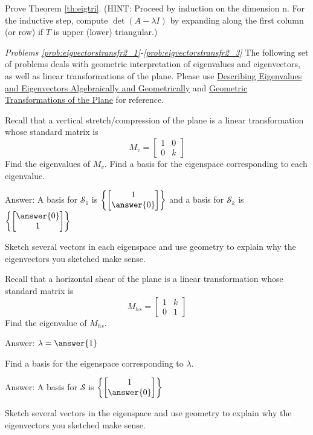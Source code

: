 \documentclass{ximera}
\begin{document}
\begin{problem}\label{prob:eigtri}
Prove Theorem \ref{th:eigtri}.  (HINT:  Proceed by induction on the dimension n.  For the inductive step, compute $\det(A-\lambda I)$ by expanding along the first column (or row) if $T$ is upper (lower) triangular.)
\end{problem}

\emph{Problems \ref{prob:eigvectorstransfr2_1}-\ref{prob:eigvectorstransfr2_3}}
The following set of problems deals with geometric interpretation of eigenvalues and eigenvectors, as well as linear transformations of the plane.  Please use \href{https://ximera.osu.edu/oerlinalg/LinearAlgebra/EIG-0010/main}{Describing Eigenvalues and Eigenvectors Algebraically and Geometrically} and \href{https://ximera.osu.edu/oerlinalg/LinearAlgebra/LTR-0070/main}{Geometric Transformations of the Plane} for reference.

\begin{problem}\label{prob:eigvectorstransfr2_1}
Recall that a vertical stretch/compression of the plane is a linear transformation whose standard matrix is $$M_v=\begin{bmatrix}1&0\\0&k\end{bmatrix}$$
Find the eigenvalues of $M_v$.  Find a basis for the eigenspace corresponding to each eigenvalue.

Answer:  A basis for $\mathcal{S}_1$ is $\left\{\begin{bmatrix}1\\\answer{0}\end{bmatrix}\right\}$
and a basis for $\mathcal{S}_k$ is $\left\{\begin{bmatrix}\answer{0}\\1\end{bmatrix}\right\}$

Sketch several vectors in each eigenspace and use geometry to explain why the eigenvectors you sketched make sense.
\end{problem}

\begin{problem}\label{prob:eigvectorstransfr2_2}
Recall that a horizontal shear of the plane is a linear transformation whose standard matrix is $$M_{hs}=\begin{bmatrix}1&k\\0&1\end{bmatrix}$$
Find the eigenvalue of $M_{hs}$.  

Answer: $\lambda=\answer{1}$

Find a basis for the eigenspace corresponding to $\lambda$.

Answer:  A basis for $\mathcal{S}$ is $\left\{\begin{bmatrix}1\\\answer{0}\end{bmatrix}\right\}$

Sketch several vectors in the eigenspace and use geometry to explain why the eigenvectors you sketched make sense.
\end{problem}
\end{document}
